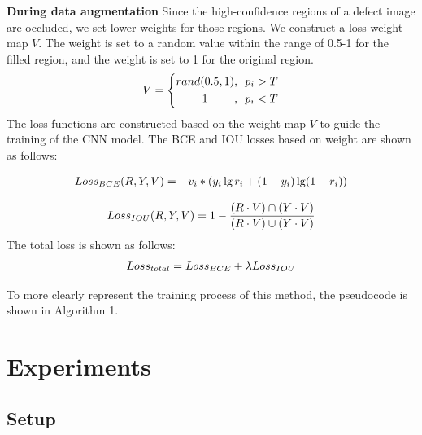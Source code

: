 \documentclass[sn-mathphys]{sn-jnl}%
\theoremstyle{thmstyleone}%
\theoremstyle{thmstyletwo}%
\theoremstyle{thmstylethree}%
\begin{document}
\textbf{During data augmentation} Since the high-confidence regions of a defect image are occluded, we set lower weights for those regions. 
We construct a loss weight map $V$. The weight is set to a random value within the range of 0.5-1 for the filled region, and the weight is set to 1 for the original region.
\begin{equation}
\centering
V =\left\{
\begin{aligned}
rand(0.5,1), &~~p_i > T \\
1~~~~~~~,&~~p_i < T \\
\end{aligned}
\right.
\end{equation}
The loss functions are constructed based on the weight map $V$ to guide the training of the CNN model. The BCE and IOU losses based on weight are shown as follows:

\begin{equation}
\centering
\begin{split}
Loss_{BCE}(R,Y,V) = - v_i * (y_i\lg r_i + (1-y_i)\lg (1-r_i) )
\label{eq:3.3.8}
\end{split}
\end{equation}

\begin{equation}
\centering
\begin{split}
Loss_{IOU}(R,Y,V) = 1 - \frac{(R \cdot V)\cap (Y \cdot V)}{(R \cdot V) \cup (Y \cdot V)}
\label{eq:3.3.8}
\end{split}
\end{equation}
The total loss is shown as follows:
\begin{equation}
\centering
\begin{split}
Loss_{total} = Loss_{BCE} + \lambda Loss_{IOU} 
\label{eq:3.3.8}
\end{split}
\end{equation}

To more clearly represent the training process of this method, the pseudocode is shown in Algorithm 1.


\section{Experiments}\label{sec:exp}
\subsection{Setup}\label{sec:exp.1}
\end{document}

